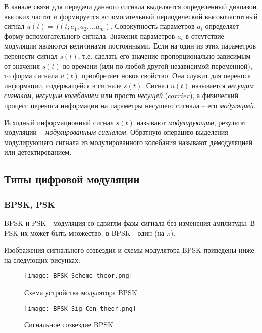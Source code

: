 В канале связи для передачи данного сигнала выделяется определенный диапазон высоких частот и формируется вспомогательный периодический высокочастотный сигнал $u(t)   =   f(t;   a_1,   a_2,   ...   a_m)$. Совокупность параметров $a_i$ определяет форму вспомогательного сигнала. Значения параметров $a_i$ в отсутствие модуляции являются величинами постоянными. Если на один из этих параметров перенести сигнал $s(t)$, т.е. сделать его значение пропорционально зависимым от значения $s(t)$ во времени (или по любой другой независимой переменной), то форма сигнала $u(t)$ приобретает новое свойство. Она служит для переноса информации, содержащейся в сигнале $s(t)$. Сигнал $u(t)$ называется \textit{несущим сигналом}, \textit{несущим колебанием} или просто \textit{несущей}  ($carrier$),  а физический процесс переноса информации на
параметры несущего сигнала     –     его \textit{модуляцией}. 

Исходный информационный сигнал $s(t)$ называют \textit{модулирующим}, результат модуляции    –    \textit{модулированным сигналом}. Обратную операцию выделения модулирующего сигнала из модулированного колебания называют демодуляцией или детектированием.

\subsection{Типы цифровой модуляции}
\subsubsection{BPSK, PSK}
BPSK и PSK - модуляция со сдвиглм фазы сигнала без изменения амплитуды. В PSK их может быть множество, в BPSK - один (на $\pi$).

Изображения сигнального созвездия и схемы модулятора BPSK приведены ниже на следующих рисунках:
\begin{figure}[H]
	\begin{center}
		\texttt{[image: BPSK\_Scheme\_theor.png]}
		\caption{Схема устройства модулятора BPSK.} %
		\label{BPSK_Scheme_theor} %
	\end{center}
\end{figure}
\begin{figure}[H]
	\begin{center}
		\texttt{[image: BPSK\_Sig\_Con\_theor.png]}
		\caption{Сигнальное созвездие BPSK.} %
		\label{BPSK_Sig_Con_theor} %
	\end{center}
\end{figure}

